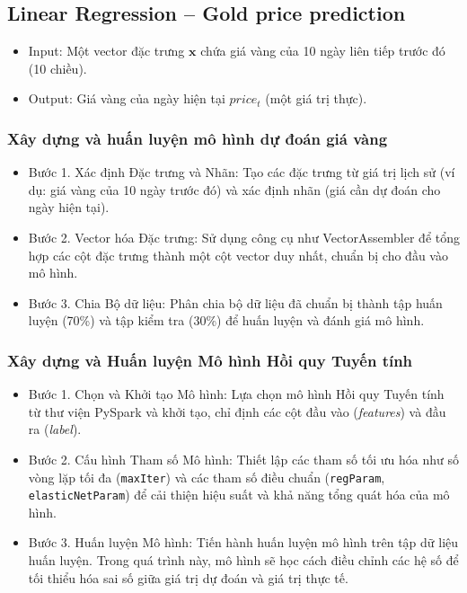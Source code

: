 \documentclass[conference]{IEEEtran}
\begin{document}
\subsection{Linear Regression – Gold price prediction}

\begin{itemize}
    \item Input: Một vector đặc trưng $\mathbf{x}$ chứa giá vàng của 10 ngày liên tiếp trước đó (10 chiều).
    \item Output: Giá vàng của ngày hiện tại $price_t$ (một giá trị thực).
\end{itemize}

\subsubsection{Xây dựng và huấn luyện mô hình dự đoán giá vàng}
\begin{itemize}
    \item Bước 1. Xác định Đặc trưng và Nhãn: Tạo các đặc trưng từ giá trị lịch sử (ví dụ: giá vàng của 10 ngày trước đó) và xác định nhãn (giá cần dự đoán cho ngày hiện tại).
    
    \item Bước 2. Vector hóa Đặc trưng: Sử dụng công cụ như VectorAssembler để tổng hợp các cột đặc trưng thành một cột vector duy nhất, chuẩn bị cho đầu vào mô hình.
    
    \item Bước 3. Chia Bộ dữ liệu: Phân chia bộ dữ liệu đã chuẩn bị thành tập huấn luyện (70\%) và tập kiểm tra (30\%) để huấn luyện và đánh giá mô hình.
\end{itemize}

\subsubsection{Xây dựng và Huấn luyện Mô hình Hồi quy Tuyến tính}
\begin{itemize}
    \item Bước 1. Chọn và Khởi tạo Mô hình: Lựa chọn mô hình Hồi quy Tuyến tính từ thư viện PySpark và khởi tạo, chỉ định các cột đầu vào (\textit{features}) và đầu ra (\textit{label}).

    \item Bước 2. Cấu hình Tham số Mô hình: Thiết lập các tham số tối ưu hóa như số vòng lặp tối đa (\texttt{maxIter}) và các tham số điều chuẩn (\texttt{regParam}, \texttt{elasticNetParam}) để cải thiện hiệu suất và khả năng tổng quát hóa của mô hình.

    \item Bước 3. Huấn luyện Mô hình: Tiến hành huấn luyện mô hình trên tập dữ liệu huấn luyện. Trong quá trình này, mô hình sẽ học cách điều chỉnh các hệ số để tối thiểu hóa sai số giữa giá trị dự đoán và giá trị thực tế.
\end{itemize}
\end{document}
